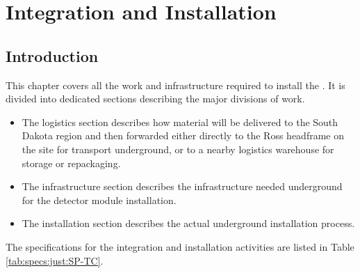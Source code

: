 \chapter{Integration and Installation}
\label{ch:sp-tc}

\section{Introduction}
\label{ch:sp-tc-intro}




This  chapter covers all the work and infrastructure required to install the .  It is divided into dedicated sections describing the major divisions of work.  

\begin{itemize}
\item The logistics section describes how material will be delivered to the South Dakota region and then forwarded  either  directly to the Ross headframe on the  site for transport underground, or to a nearby logistics warehouse for storage or repackaging. 
\item The infrastructure section describes the infrastructure needed underground for the detector module installation.
\item The installation section describes the actual underground installation process. 
\end{itemize}
 The specifications for the integration and installation activities are listed in Table \ref{tab:specs:just:SP-TC}.

